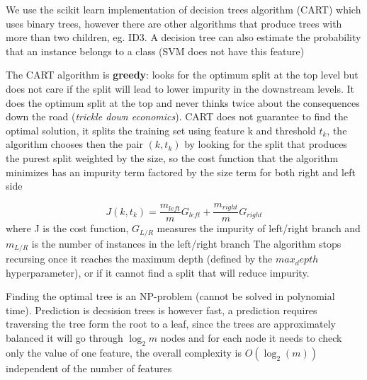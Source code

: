 \documentclass[11pt]{article}
\theoremstyle{definition}
\theoremstyle{remark}
\begin{document}
{We use the scikit learn implementation of decision trees algorithm (CART) which uses binary trees, however there are other algorithms that produce trees with more than two children, eg. ID3.
A decision tree can also estimate the probability that an instance belongs to a class (SVM does not have this feature)

The CART algorithm is \textbf{greedy}: looks for the optimum split at the top level but does not care if the split will lead to lower impurity in the downstream levels. It does the optimum split at the top and never thinks twice about the consequences down the road (\emph{trickle down economics}). CART does not guarantee to find the optimal solution, it splits the training set using feature k and threshold $t_k$, the algorithm chooses then the pair $(k,t_k)$ by looking for the split that produces the purest split weighted by the size, so the cost function that the algorithm minimizes has an impurity term factored by the size term for both right and left side 

\begin{equation}\label{eq:cart}
J(k,t_k) = \frac{m_{left}}{m}G_{left} + \frac{m_{right}}{m}G_{right}
\end{equation}
where J is the cost function, $G_{L/R}$ measures the impurity of left/right branch and $m_{L/R}$ is the number of instances in the left/right branch 
The algorithm stops recursing once it reaches the maximum depth (defined by the $max_depth$ hyperparameter), or if it cannot find a split that will reduce impurity. 

Finding the optimal tree is an NP-problem (cannot be solved in polynomial time). Prediction is decsision trees is however fast, a prediction requires traversing the tree form the root to a leaf, since the trees are approximately balanced it will go through $\log_2m$ nodes and for each node it needs to check only the value of one feature, the overall complexity is $O(\log_2(m))$ independent of the number of features

}
\end{document}
